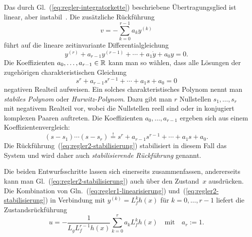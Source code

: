 Das durch Gl.~(\ref{eq:regler-integratorkette}) beschriebene Übertragungsglied
ist linear, aber instabil~\cite{reinschke2014buch}. Die zusätzliche
Rückführung 
\begin{equation}
v=-\sum_{k=0}^{r-1}a_{k}y^{(k)}\label{eq:regler2-stabilisierung}
\end{equation}
führt auf die lineare zeitinvariante Differentialgleichung 
\begin{equation}
y^{(r)}+a_{r-1}y^{(r-1)}+\cdots+a_{1}\dot{y}+a_{0}y=0.\label{eq:lineare-dgl-ordnung-r}
\end{equation}
Die Koeffizienten $a_{0},\ldots,a_{r-1}\in{\mathbb{R}}$ kann man so wählen,
dass alle Lösungen der zugehörigen charakteristischen Gleichung 
\begin{equation}
s^{r}+a_{r-1}s^{r-1}+\cdots+a_{1}s+a_{0}=0\label{eq:rg-gl-char-gleichung}
\end{equation}
negativen Realteil aufweisen. Ein solches charakteristisches Polynom
nennt man \emph{stabiles Polynom} oder \emph{Hurwitz-Polynom}.
Dazu gibt man $r$ Nullstellen $s_{1},\ldots,s_{r}$ mit negativem
Realteil vor, wobei die Nullstellen reell sind oder in konjugiert
komplexen Paaren auftreten. Die Koeffizienten $a_{0},\ldots,a_{r-1}$
ergeben sich aus einem Koeffizientenvergleich: 
\[
(s-s_{1})\cdots(s-s_{r})\stackrel{!}{=}s^{r}+a_{r-1}s^{r-1}+\cdots+a_{1}s+a_{0}.
\]
Die Rückführung~(\ref{eq:regler2-stabilisierung}) stabilisiert in
diesem Fall das System und wird daher auch \emph{stabilisierende Rückführung}
genannt.

Die beiden Entwurfsschritte lassen sich einerseits zusammenfassen,
andererseits kann man Gl.~(\ref{eq:regler2-stabilisierung}) auch
über den Zustand~$x$ ausdrücken. Die Kombination von Gln.~(\ref{eq:regler1-linearisierung})
und~(\ref{eq:regler2-stabilisierung}) in Verbindung mit $y^{(k)}=L_{f}^{k}h(x)$
für $k=0,\ldots,r-1$ liefert die Zustandsrückführung 
\begin{equation}
u=-\frac{1}{L_{g}L_{f}^{r-1}h(x)}\sum_{k=0}^{r}a_{k}L_{f}^{k}h(x)\quad\text{mit}\quad a_{r}:=1.\label{eq:regler3-linearisierung-stabilisierung}
\end{equation}


